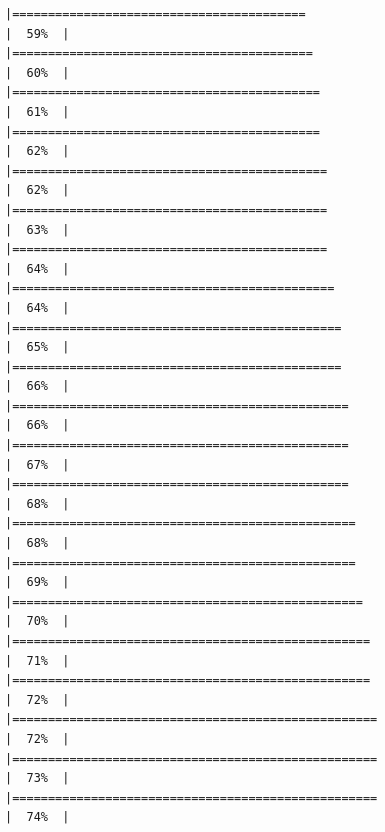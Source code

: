 \documentclass[
]{book}
\begin{document}
\begin{verbatim}
|=========================================                             |  59%  |                                                                              |==========================================                            |  60%  |                                                                              |===========================================                           |  61%  |                                                                              |===========================================                           |  62%  |                                                                              |============================================                          |  62%  |                                                                              |============================================                          |  63%  |                                                                              |============================================                          |  64%  |                                                                              |=============================================                         |  64%  |                                                                              |==============================================                        |  65%  |                                                                              |==============================================                        |  66%  |                                                                              |===============================================                       |  66%  |                                                                              |===============================================                       |  67%  |                                                                              |===============================================                       |  68%  |                                                                              |================================================                      |  68%  |                                                                              |================================================                      |  69%  |                                                                              |=================================================                     |  70%  |                                                                              |==================================================                    |  71%  |                                                                              |==================================================                    |  72%  |                                                                              |===================================================                   |  72%  |                                                                              |===================================================                   |  73%  |                                                                              |===================================================                   |  74%  |                                                                              
\end{verbatim}
\end{document}
